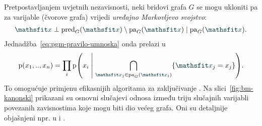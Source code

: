 \documentclass[utf8, diplomski, lmodern]{fer}
\begin{document}
Pretpostavljanjem uvjetnih nezavisnosti, neki bridovi grafa $G$ se mogu ukloniti pa za varijable (čvorove grafa) vrijedi \emph{uređajno Markovljevo svojstvo}:
\begin{align}
\rvar x\perp \pred_G(\rvar x) \setminus \pa_G(\rvar x) \mid \pa_G(\rvar x).
\end{align}
Jednadžba~\eqref{eq:pgm-pravilo-umnoska} onda prelazi u 
\begin{align}
\p(x_1,..,x_n) 
= \prod_i\p\del{x_i \midmid \bigcap_{\rvar x_j\in\pa_G(\rvar x_i)}\cbr{\rvar x_j=x_j}} \text{.}
\end{align} 
To omogućuje primjenu efikasnijih algoritama za zaključivanje \citep{Murphy:2012:MLPP}.
Na slici~\ref{fig:bm-kanonski} prikazani su osnovni slučajevi odnosa između triju slučajnih varijabli povezanih zavisnostima koje mogu biti dio većeg grafa. Oni su detaljnije objašnjeni npr. u \citet{Bishop:2006:PRML} i \citet{Alpaydin:2014:IML}. 
\end{document}
